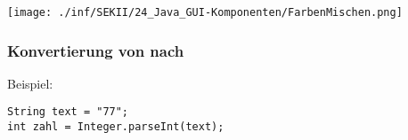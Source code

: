 \begin{minipage}{0.5\textwidth}
\texttt{[image: ./inf/SEKII/24\_Java\_GUI-Komponenten/FarbenMischen.png]}
\end{minipage}
\hfill
\begin{minipage}{0.4\textwidth}
\subsubsection{Konvertierung von  nach }

Beispiel:

\begin{lstlisting}
String text = "77";
int zahl = Integer.parseInt(text);
\end{lstlisting}
\end{minipage}